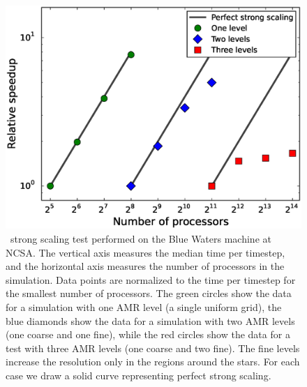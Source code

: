 \documentclass[12pt]{article}
\begin{document}
\begin{figure}
  \centering
  \includegraphics[scale=0.8]{plots/strong_scaling}
  \caption[\castro\ strong scaling test]
          {\castro\ strong scaling test performed on the Blue Waters machine at
           NCSA. The vertical axis measures the median time per timestep, and the
           horizontal axis measures the number of processors in the simulation. Data
           points are normalized to the time per timestep for the smallest number
           of processors. The green circles show the data for a simulation with one
           AMR level (a single uniform grid), the blue diamonds show the data for a simulation with two AMR
           levels (one coarse and one fine), while the red circles show the data
           for a test with three AMR levels (one coarse and two fine). The fine levels
           increase the resolution only in the regions around the stars. For each case
           we draw a solid curve representing perfect strong scaling.
           \label{fig:strong_scaling}}
\end{figure}
\end{document}
